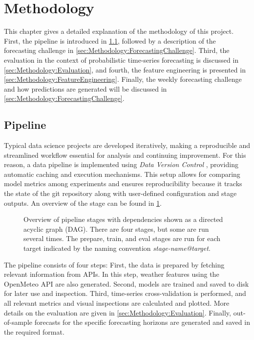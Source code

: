 \newpage
\section{Methodology}
\label{ch:Methodology}

This chapter gives a detailed explanation of the methodology of this project. First, the pipeline is introduced in \cref{sec:Methodology:Pipeline}, followed by a description of the forecasting challenge in \cref{sec:Methodology:ForecastingChallenge}. Third, the evaluation in the context of probabilistic time-series forecasting is discussed in \cref{sec:Methodology:Evaluation}, and fourth, the feature engineering is presented in \cref{sec:Methodology:FeatureEngineering}.
Finally, the weekly forecasting challenge and how predictions are generated will be discussed in \cref{sec:Methodology:ForecastingChallenge}.


\subsection{Pipeline}
\label{sec:Methodology:Pipeline}

Typical data science projects are developed iteratively, making a reproducible and streamlined workflow essential for analysis and continuing improvement. For this reason, a data pipeline is implemented using \textit{Data Version Control} \parencite{ruslan_kuprieiev_dvc_2024}, providing automatic caching and execution mechanisms. This setup allows for comparing model metrics among experiments and ensures reproducibility because it tracks the state of the git repository along with user-defined configuration and stage outputs. An overview of the stage can be found in \cref{fig:pipeline}.
\begin{figure}[htbp]
  \centering
  
  \caption{Overview of pipeline stages with dependencies shown as a directed acyclic graph (DAG). There are four stages, but some are run several times. The prepare, train, and eval stages are run for each target indicated by the naming convention \textit{stage-name@target}.} 
  \label{fig:pipeline}
\end{figure}
The pipeline consists of four steps: First, the data is prepared by fetching relevant information from APIs. In this step, weather features using the OpenMeteo API are also generated. Second, models are trained and saved to disk for later use and inspection. Third, time-series cross-validation is performed, and all relevant metrics and visual inspections are calculated and plotted. More details on the evaluation are given in \cref{sec:Methodology:Evaluation}. Finally, out-of-sample forecasts for the specific forecasting horizons are generated and saved in the required format.

